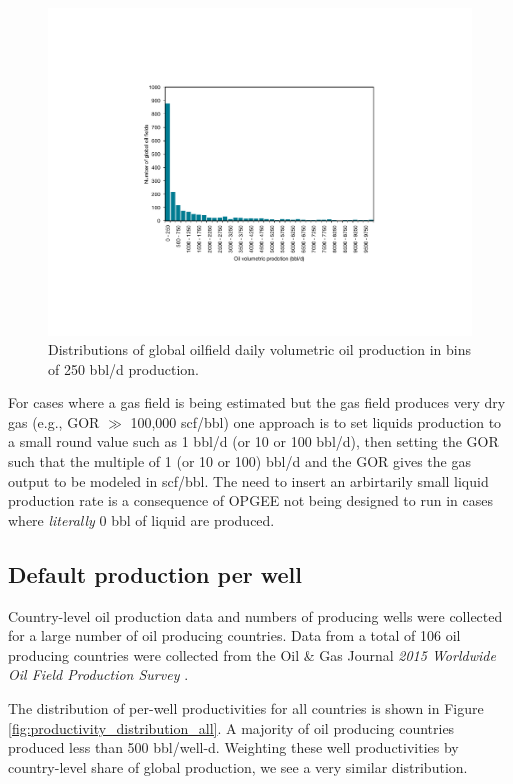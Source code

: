 \documentclass[11pt]{report}
\begin{document}
\begin{figure}[t]
\includegraphics[width=0.8\columnwidth]{images/production_distribution.pdf}
\caption{Distributions of global oilfield daily volumetric oil production in bins of 250 bbl/d production.}
\label{fig:production_distribution}
\end{figure}

For cases where a gas field is being estimated but the gas field produces very dry gas (e.g., GOR $\gg$ 100,000 scf/bbl) one approach is to set liquids production to a small round value such as 1 bbl/d (or 10 or 100 bbl/d), then setting the GOR such that the multiple of 1 (or 10 or 100) bbl/d and the GOR gives the gas output to be modeled in scf/bbl. The need to insert an arbirtarily small liquid production rate is a consequence of OPGEE not being designed to run in cases where \emph{literally} 0 bbl of liquid are produced. 



\subsection{Default production per well} \label{sec:well_production}

Country-level oil production data and numbers of producing wells were collected for a large number of oil producing countries. Data from a total of 106 oil producing countries were collected from the Oil \& Gas Journal \emph{2015 Worldwide Oil Field Production Survey} \cite{OGJ2015}. 

The distribution of per-well productivities for all countries is shown in Figure \ref{fig:productivity_distribution_all}. A majority of oil producing countries produced less than 500 bbl/well-d. Weighting these well productivities by country-level share of global production, we see a very similar distribution.
\end{document}
